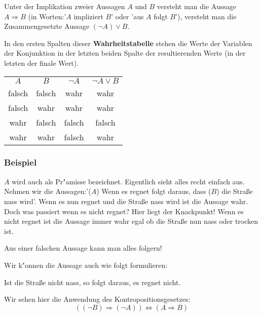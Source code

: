\begin{definition}[Implikation]
Unter der Implikation zweier Aussagen $A$ und $B$ versteht man die Aussage $A \Rightarrow B$ (in Worten:'$A$ impliziert $B$' oder 'aus $A$ folgt $B$'), versteht man die Zusammengesetzte Aussage $ (\neg A) \lor B$.
\end{definition}
In den ersten Spalten dieser \textbf{Wahrheitstabelle} stehen die Werte der Variablen der Konjunktion in der letzten beiden Spalte der resultierenden Werte (in der letzten der finale Wert).
\begin{center}
\begin{tabular}{c|c||c||c}
$A$& $B$ &$\neg A$&  $\neg A \lor B$  \\ 
 \cellcolor{ared}falsch &  \cellcolor{ared}falsch & \cellcolor{agreen}wahr  & \cellcolor{agreen}wahr  \\ 
 \cellcolor{ared}falsch & \cellcolor{agreen}wahr & \cellcolor{agreen}wahr  &  \cellcolor{agreen}wahr  \\ 
\cellcolor{agreen}wahr &  \cellcolor{ared}falsch & \cellcolor{ared} falsch  &  \cellcolor{ared}falsch  \\ 
\cellcolor{agreen}wahr & \cellcolor{agreen}wahr & \cellcolor{ared} falsch  &  \cellcolor{agreen}wahr  \\ 
\hline
\end{tabular}
\end{center}

\subsubsection*{Beispiel}
$A$ wird auch als Pr"amisse bezeichnet. Eigentlich sieht alles recht einfach aus. Nehmen wir die Aussagen:'($A$) Wenn es regnet folgt daraus, dass ($B$) die Stra{\ss}e nass wird'. Wenn es nun regnet und die Stra{\ss}e nass wird ist die Aussage wahr. Doch was passiert wenn es nicht regnet? Hier liegt der Knackpunkt! Wenn es nicht regnet ist die Aussage immer wahr egal ob die Stra{\ss}e nun nass oder trocken ist.
\begin{center}
Aus einer falschen Aussage kann man alles folgern!
\end{center}
Wir k"onnen die Aussage auch wie folgt formulieren:
\begin{center}
Ist die Stra{\ss}e nicht nass, so folgt daraus, es regnet nicht. 
\end{center}
Wir sehen hier die Anwendung des Kontropositionsgesetzes:
\begin{equation*}
((\neg B) \Rightarrow (\neg A)) \iff (A \Rightarrow B)
\end{equation*}

